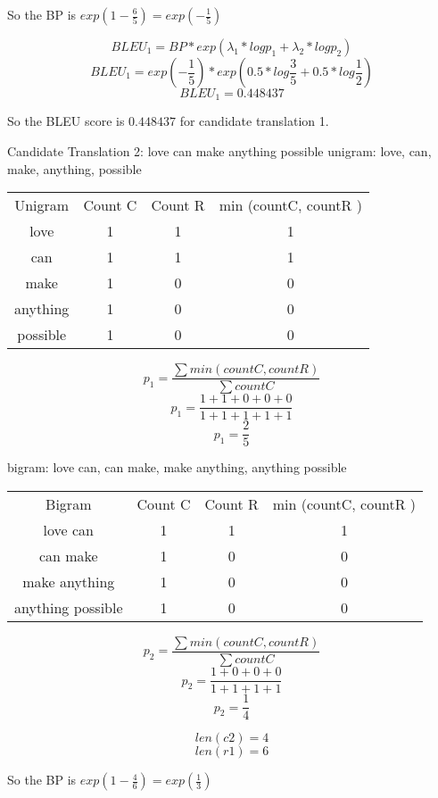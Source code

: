 \documentclass[11pt,largemargins]{homework}
\begin{document}
So the BP is $exp(1 - \frac{6}{5}) = exp(-\frac{1}{5})$

$$BLEU_1 = BP * exp(\lambda_1 * log p_1 + \lambda_2 * log p_2) $$  
$$BLEU_1 = exp(-\frac{1}{5}) * exp(0.5 * log \frac{3}{5} + 0.5 * log \frac{1}{2}) $$  
$$BLEU_1 = 0.448437 $$

So the BLEU score is $0.448437$ for candidate translation 1.

\hfill \break
\hfill \break
\hfill \break
Candidate Translation 2: love can make anything possible
unigram: love, can, make, anything, possible

\begin{center}
\begin{tabular}{ |c|c|c|c| }
 \hline
   Unigram & Count C & Count R & min (countC, countR ) \\
   love & 1 & 1 & 1 \\ 
   can & 1 & 1 & 1 \\
   make & 1 & 0 & 0 \\
   anything & 1 & 0 & 0 \\
   possible & 1 & 0 & 0 \\
 \hline
\end{tabular}
\end{center}

$$ p_1 = \frac{\sum min (countC, countR)}{ \sum countC } $$
$$ p_1 = \frac{1 + 1 + 0 + 0 + 0}{ 1 + 1 + 1 + 1 + 1 } $$
$$ p_1 = \frac{2}{5} $$



bigram: love can, can make, make anything, anything possible

\begin{center}
\begin{tabular}{ |c|c|c|c| }
 \hline
   Bigram & Count C & Count R & min (countC, countR ) \\
   love can & 1 & 1 & 1 \\ 
   can make& 1 & 0 & 0 \\
   make anything& 1 & 0 & 0 \\
   anything possible & 1 & 0 & 0 \\
 \hline
\end{tabular}
\end{center}

$$ p_2 = \frac{\sum min (countC, countR)}{ \sum countC } $$
$$ p_2 = \frac{1 + 0 + 0 + 0}{ 1 + 1 + 1 + 1 } $$
$$ p_2 = \frac{1}{4}$$


$$len(c2) = 4$$
$$len(r1) = 6$$

So the BP is $exp(1 - \frac{4}{6}) = exp(\frac{1}{3})$
\end{document}
